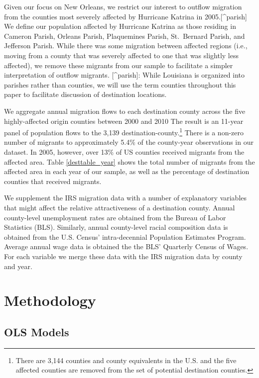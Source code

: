\documentclass[]{article}
\let\rmarkdownfootnote\footnote%
\def\footnote{\protect\rmarkdownfootnote}
\begin{document}
Given our focus on New Orleans, we restrict our interest to outflow
migration from the counties most severely affected by Hurricane Katrina
in 2005.{[}\^{}parish{]} We define our population affected by Hurricane
Katrina as those residing in Cameron Parish, Orleans Parish, Plaquemines
Parish, St.~Bernard Parish, and Jefferson Parish. While there was some
migration between affected regions (i.e., moving from a county that was
severely affected to one that was slightly less affected), we remove
these migrants from our sample to facilitate a simpler interpretation of
outflow migrants. {[}\^{}parish{]}: While Louisiana is organized into
parishes rather than counties, we will use the term counties throughout
this paper to facilitate discussion of destination locations.

We aggregate annual migration flows to each destination county across
the five highly-affected origin counties between 2000 and 2010 The
result is an 11-year panel of population flows to the 3,139
destination-county.\footnote{There are 3,144 counties and county
  equivalents in the U.S. and the five affected counties are removed
  from the set of potential destination counties.} There is a non-zero
number of migrants to approximately 5.4\% of the county-year
observations in our dataset. In 2005, however, over 13\% of US counties
received migrants from the affected area. Table \ref{desttable_year}
shows the total number of migrants from the affected area in each year
of our sample, as well as the percentage of destination counties that
received migrants.

We supplement the IRS migration data with a number of explanatory
variables that might affect the relative attractiveness of a destination
county. Annual county-level unemployment rates are obtained from the
Bureau of Labor Statistics (BLS). Similarly, annual county-level racial
composition data is obtained from the U.S. Census' intra-decennial
Population Estimates Program. Average annual wage data is obtained the
the BLS' Quarterly Census of Wages. For each variable we merge these
data with the IRS migration data by county and year.

\section{\texorpdfstring{Methodology
\label{sec:meth}}{Methodology }}\label{methodology}

\subsection{OLS Models}\label{ols-models}
\end{document}
